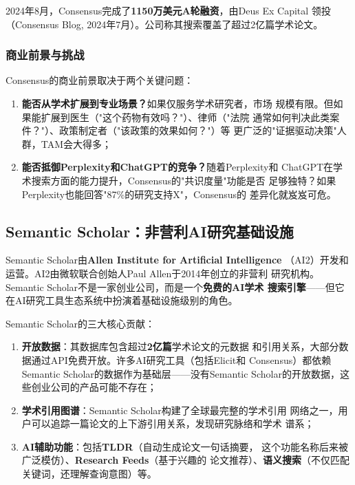 2024年8月，Consensus完成了\textbf{1150万美元A轮融资}，由Deus Ex Capital
领投（Consensus Blog, 2024年7月）。公司称其搜索覆盖了超过2亿篇学术论文。

\subsubsection{商业前景与挑战}
Consensus的商业前景取决于两个关键问题：

\begin{enumerate}
  \item \textbf{能否从学术扩展到专业场景？}如果仅服务学术研究者，市场
    规模有限。但如果能扩展到医生（"这个药物有效吗？"）、律师（"法院
    通常如何判决此类案件？"）、政策制定者（"该政策的效果如何？"）等
    更广泛的"证据驱动决策"人群，TAM会大得多；
  \item \textbf{能否抵御Perplexity和ChatGPT的竞争？}随着Perplexity和
    ChatGPT在学术搜索方面的能力提升，Consensus的"共识度量"功能是否
    足够独特？如果Perplexity也能回答"87\%的研究支持X"，Consensus的
    差异化就岌岌可危。
\end{enumerate}

\subsection{Semantic Scholar：非营利AI研究基础设施}
\label{subsec:semantic-scholar}

Semantic Scholar由\textbf{Allen Institute for Artificial Intelligence}
（AI2）开发和运营。AI2由微软联合创始人Paul Allen于2014年创立的非营利
研究机构。Semantic Scholar不是一家创业公司，而是一个\textbf{免费的AI学术
搜索引擎}——但它在AI研究工具生态系统中扮演着基础设施级别的角色。

Semantic Scholar的三大核心贡献：

\begin{enumerate}
  \item \textbf{开放数据}：其数据库包含超过\textbf{2亿篇}学术论文的元数据
    和引用关系，大部分数据通过API免费开放。许多AI研究工具（包括Elicit和
    Consensus）都依赖Semantic Scholar的数据作为基础层——没有Semantic
    Scholar的开放数据，这些创业公司的产品可能不存在；
  \item \textbf{学术引用图谱}：Semantic Scholar构建了全球最完整的学术引用
    网络之一，用户可以追踪一篇论文的上下游引用关系，发现研究脉络和学术
    谱系；
  \item \textbf{AI辅助功能}：包括\textbf{TLDR}（自动生成论文一句话摘要，
    这个功能名称后来被广泛模仿）、\textbf{Research Feeds}（基于兴趣的
    论文推荐）、\textbf{语义搜索}（不仅匹配关键词，还理解查询意图）等。
\end{enumerate}

